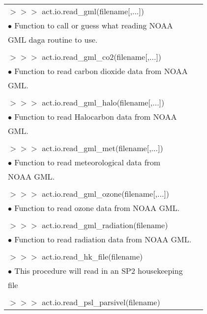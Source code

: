 \documentclass[potrait, z1paper, fontscale=0.33]{baposter} %
\begin{document}
\begin{poster}
{\begin{flushleft}
\begin{tabular}{@{}ll@{}}
\\
$>$$>$$>$ act.io.read\_gml(filename[,...])\\
\-\hspace{0.2cm} $\bullet$ Function to call or guess what reading NOAA\\
\-\hspace{0.5cm} GML daga routine to use.\\
\\
$>$$>$$>$ act.io.read\_gml\_co2(filename[,...])\\
\-\hspace{0.2cm} $\bullet$ Function to read carbon dioxide data from NOAA\\
\-\hspace{0.5cm} GML.\\
\\
$>$$>$$>$ act.io.read\_gml\_halo(filename[,...])\\
\-\hspace{0.2cm} $\bullet$ Function to read Halocarbon data from NOAA\\
\-\hspace{0.5cm} GML.\\
\\
$>$$>$$>$ act.io.read\_gml\_met(filename[,...])\\
\-\hspace{0.2cm} $\bullet$ Function to read meteorological data from\\
\-\hspace{0.5cm} NOAA GML.\\
\\
$>$$>$$>$ act.io.read\_gml\_ozone(filename[,...])\\
\-\hspace{0.2cm} $\bullet$ Function to read ozone data from NOAA GML.\\
\\
$>$$>$$>$ act.io.read\_gml\_radiation(filename)\\
\-\hspace{0.2cm} $\bullet$ Function to read radiation data from NOAA GML.\\
\\
$>$$>$$>$ act.io.read\_hk\_file(filename)\\
\-\hspace{0.2cm} $\bullet$ This procedure will read in an SP2 housekeeping\\
\-\hspace{0.5cm} file\\
\\
$>$$>$$>$ act.io.read\_psl\_parsivel(filename)\\

\end{tabular}
\end{flushleft}}
\end{poster}
\end{document}
